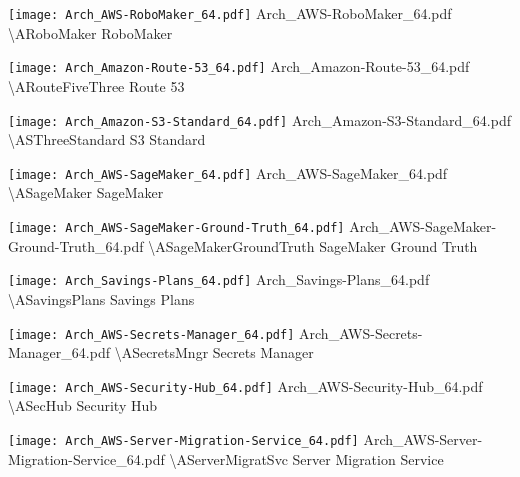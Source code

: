  {\texttt{[image: Arch\_AWS-RoboMaker\_64.pdf]}} {Arch\_AWS-RoboMaker\_64.pdf} {{\textbackslash}ARoboMaker} {RoboMaker}

 {\texttt{[image: Arch\_Amazon-Route-53\_64.pdf]}} {Arch\_Amazon-Route-53\_64.pdf} {{\textbackslash}ARouteFiveThree} {Route 53}

 {\texttt{[image: Arch\_Amazon-S3-Standard\_64.pdf]}} {Arch\_Amazon-S3-Standard\_64.pdf} {{\textbackslash}ASThreeStandard} {S3 Standard}

 {\texttt{[image: Arch\_AWS-SageMaker\_64.pdf]}} {Arch\_AWS-SageMaker\_64.pdf} {{\textbackslash}ASageMaker} {SageMaker}

 {\texttt{[image: Arch\_AWS-SageMaker-Ground-Truth\_64.pdf]}} {Arch\_AWS-SageMaker-Ground-Truth\_64.pdf} {{\textbackslash}ASageMakerGroundTruth} {SageMaker Ground Truth}

 {\texttt{[image: Arch\_Savings-Plans\_64.pdf]}} {Arch\_Savings-Plans\_64.pdf} {{\textbackslash}ASavingsPlans} {Savings Plans}

 {\texttt{[image: Arch\_AWS-Secrets-Manager\_64.pdf]}} {Arch\_AWS-Secrets-Manager\_64.pdf} {{\textbackslash}ASecretsMngr} {Secrets Manager}

 {\texttt{[image: Arch\_AWS-Security-Hub\_64.pdf]}} {Arch\_AWS-Security-Hub\_64.pdf} {{\textbackslash}ASecHub} {Security Hub}

 {\texttt{[image: Arch\_AWS-Server-Migration-Service\_64.pdf]}} {Arch\_AWS-Server-Migration-Service\_64.pdf} {{\textbackslash}AServerMigratSvc} {Server Migration Service}

